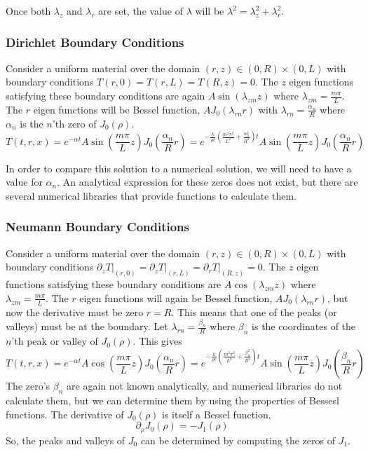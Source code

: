 \documentclass[letterpaper,12pt]{article}
\begin{document}
Once both $\lambda_z$ and $\lambda_r$ are set, the value of $\lambda$ will be $\lambda^2 = \lambda_z^2 + \lambda_r^2$.

\subsubsection{Dirichlet Boundary Conditions}
Consider a uniform material over the domain $(r,z) \in (0,R)\times(0,L)$ with boundary conditions $T(r,0) = T(r,L) = T(R,z) = 0$.
The $z$ eigen functions satisfying these boundary conditions are again 
$A \sin(\lambda_{zm} z)$ where $\lambda_{zm} = \frac{m\pi}{L}$.
The $r$ eigen functions will be Bessel function, $A J_0(\lambda_{rn} r)$ with $\lambda_{rn} = \frac{\alpha_n}{R}$ where
$\alpha_n$ is the $n$'th zero of $J_0(\rho)$.
\begin{equation}
T(t,r,x) = e^{-\alpha t} A \sin\left(\frac{m\pi}{L} z\right) J_0\left(\frac{\alpha_n}{R} r\right) = 
e^{-\frac{k}{\rho c}\left( \frac{m^2\pi^2}{L^2} + \frac{\alpha_n^2}{R^2}\right) t} A \sin\left(\frac{m\pi}{L} z\right) J_0\left(\frac{\alpha_n}{R} r\right)
\end{equation}

In order to compare this solution to a numerical solution, we will need to have a value for $\alpha_n$. An analytical expression
for these zeros does not exist, but there are several numerical libraries that provide functions to calculate them.

\subsubsection{Neumann Boundary Conditions}
Consider a uniform material over the domain $(r,z) \in (0,R)\times(0,L)$ with boundary conditions
$\left.\partial_z T\right|_{(r,0)} = \left.\partial_z T\right|_{(r,L)} = \left.\partial_r T\right|_{(R,z)} = 0$.
The $z$ eigen functions satisfying these boundary conditions are
$A \cos(\lambda_{zm} z)$ where $\lambda_{zm} = \frac{m\pi}{L}$.
The $r$ eigen functions will again be Bessel function, $A J_0(\lambda_{rn} r)$, but now the derivative must
be zero $r = R$. This means that one of the peaks (or valleys) must be at the boundary. Let $\lambda_{rn} = \frac{\beta_n}{R}$ where
$\beta_n$ is the coordinates of the $n$'th peak or valley of $J_0(\rho)$. This gives
\begin{equation}
T(t,r,x) = e^{-\alpha t} A \cos\left(\frac{m\pi}{L} z\right) J_0\left(\frac{\alpha_n}{R} r\right) = 
e^{-\frac{k}{\rho c}\left( \frac{m^2\pi^2}{L^2} + \frac{\beta_n^2}{R^2}\right) t} A \sin\left(\frac{m\pi}{L} z\right) J_0\left(\frac{\beta_n}{R} r\right)
\end{equation}
The zero's $\beta_n$ are again not known analytically, and numerical libraries do not calculate them, but we can determine them by using
the properties of Bessesl functions. The derivative of $J_0(\rho)$ is itself a Bessel function,
\begin{equation}
  \partial_\rho J_0(\rho) = -J_1(\rho)
\end{equation}
So, the peaks and valleys of $J_0$ can be determined by computing the zeros of $J_1$.
\end{document}
